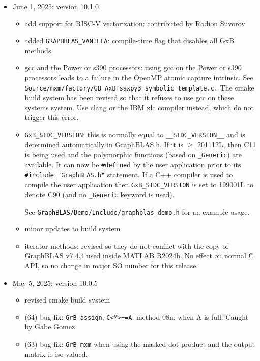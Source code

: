 \begin{itemize}
\item June 1, 2025: version 10.1.0

    \begin{itemize}
    \item add support for RISC-V vectorization: contributed by Rodion Suvorov
    \item added \verb'GRAPHBLAS_VANILLA': compile-time flag that disables all
        GxB methods.
    \item gcc and the Power or s390 processors:  using gcc on the Power or s390
        processors leads to a failure in the OpenMP atomic capture intrinsic.
        See \verb'Source/mxm/factory/GB_AxB_saxpy3_symbolic_template.c.'  The
        cmake build system has been revised so that it refuses to use gcc on
        these systems system.  Use clang or the IBM xlc compiler instead, which
        do not trigger this error.
    \item \verb'GxB_STDC_VERSION': this is normally equal to
        \verb'__STDC_VERSION__' and is determined automatically in GraphBLAS.h.
        If it is $\ge$ 201112L, then C11 is being used and the polymorphic
        functions (based on \verb'_Generic') are available.  It can now be
        \verb'#define'd by the user application prior to its
        \verb'#include "GraphBLAS.h"' statement.  If a C++ compiler is used to
        compile the user application then \verb'GxB_STDC_VERSION' is set to
        199001L to denote C90 (and no \verb'_Generic' keyword is used).

        See \verb'GraphBLAS/Demo/Include/graphblas_demo.h' for an example usage.
    \item minor updates to build system
    \item iterator methods: revised so they do not conflict with the copy of
        GraphBLAS v7.4.4 used inside MATLAB R2024b.  No effect on normal
        C API, so no change in major SO number for this release.
    \end{itemize}

\item May 5, 2025: version 10.0.5

    \begin{itemize}
    \item revised cmake build system
    \item (64) bug fix: \verb'GrB_assign', \verb'C<M>+=A',
        method 08n, when A is full.  Caught by Gabe Gomez.
    \item (63) bug fix: \verb'GrB_mxm' when using the masked dot-product
        and the output matrix is iso-valued.
    \end{itemize}


\end{itemize}
